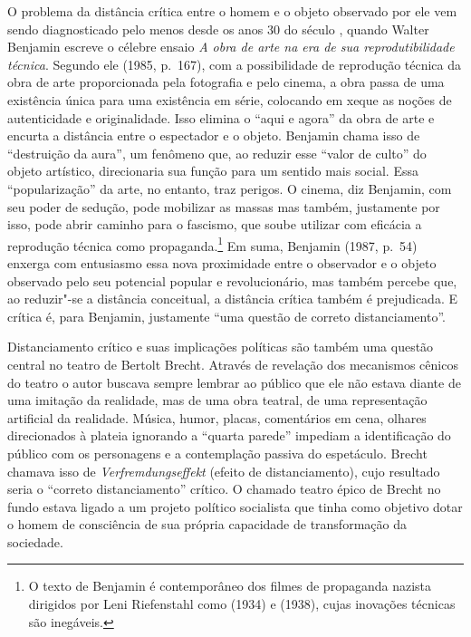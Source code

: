 O problema da distância crítica entre o homem e o objeto observado por
ele vem sendo diagnosticado pelo menos desde os anos 30 do século ,
quando Walter Benjamin escreve o célebre ensaio \emph{A obra de arte na
era de sua reprodutibilidade técnica}. Segundo ele (1985, p.~167), com a
possibilidade de reprodução técnica da obra de arte proporcionada pela
fotografia e pelo cinema, a obra passa de uma existência única para uma
existência em série, colocando em xeque as noções de autenticidade e
originalidade. Isso elimina o ``aqui e agora'' da obra de arte e encurta
a distância entre o espectador e o objeto. Benjamin chama isso de
``destruição da aura'', um fenômeno que, ao reduzir esse ``valor de
culto'' do objeto artístico, direcionaria sua função para um sentido
mais social. Essa ``popularização'' da arte, no entanto, traz perigos. O
cinema, diz Benjamin, com seu poder de sedução, pode mobilizar as massas
mas também, justamente por isso, pode abrir caminho para o fascismo, que
soube utilizar com eficácia a reprodução técnica como
propaganda.\footnote{O texto de Benjamin é contemporâneo dos filmes de
  propaganda nazista dirigidos por Leni Riefenstahl como {} (1934) e {} (1938), cujas inovações técnicas
  são inegáveis.} Em suma, Benjamin (1987, p.~54) enxerga com entusiasmo essa nova
proximidade entre o observador e o objeto observado pelo seu potencial
popular e revolucionário, mas também percebe que, ao reduzir"-se a
distância conceitual, a distância crítica também é prejudicada. E
crítica é, para Benjamin, justamente ``uma questão de
correto distanciamento''.

Distanciamento crítico e suas implicações políticas são também uma
questão central no teatro de Bertolt Brecht. Através de revelação dos
mecanismos cênicos do teatro o autor buscava sempre lembrar ao público
que ele não estava diante de uma imitação da realidade, mas de uma obra
teatral, de uma representação artificial da realidade. Música, humor,
placas, comentários em cena, olhares direcionados à plateia ignorando a
``quarta parede'' impediam a identificação do público com os personagens
e a contemplação passiva do espetáculo. Brecht chamava isso de
\emph{Verfremdungseffekt} (efeito de distanciamento), cujo resultado
seria o ``correto distanciamento'' crítico. O chamado teatro épico de
Brecht no fundo estava ligado a um projeto político socialista que tinha
como objetivo dotar o homem de consciência de sua própria capacidade de
transformação da sociedade.

